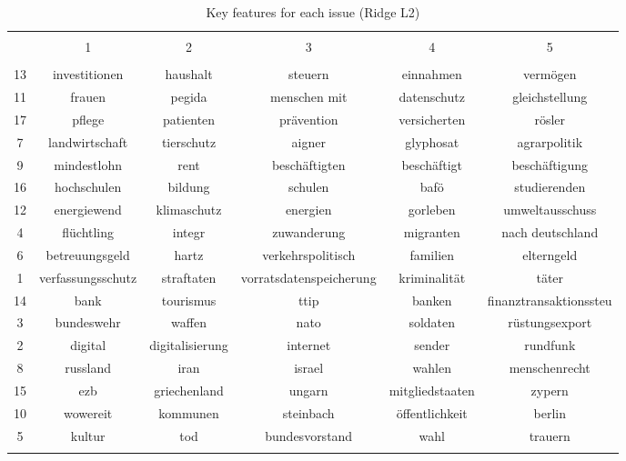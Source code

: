 
\begin{table}[!htbp] \centering 
  \caption{Key features for each issue (Ridge L2)} 
  \label{tab:key_feats} 
\begin{tabular}{@{\extracolsep{5pt}} cccccc} 
\\[-1.8ex]\hline 
\hline \\[-1.8ex] 
 & 1 & 2 & 3 & 4 & 5 \\ 
\hline \\[-1.8ex] 
13 & investitionen & haushalt & steuern & einnahmen & vermögen \\ 
11 & frauen & pegida & menschen mit & datenschutz & gleichstellung \\ 
17 & pflege & patienten & prävention & versicherten & rösler \\ 
7 & landwirtschaft & tierschutz & aigner & glyphosat & agrarpolitik \\ 
9 & mindestlohn & rent & beschäftigten & beschäftigt & beschäftigung \\ 
16 & hochschulen & bildung & schulen & bafö & studierenden \\ 
12 & energiewend & klimaschutz & energien & gorleben & umweltausschuss \\ 
4 & flüchtling & integr & zuwanderung & migranten & nach deutschland \\ 
6 & betreuungsgeld & hartz & verkehrspolitisch & familien & elterngeld \\ 
1 & verfassungsschutz & straftaten & vorratsdatenspeicherung & kriminalität & täter \\ 
14 & bank & tourismus & ttip & banken & finanztransaktionssteu \\ 
3 & bundeswehr & waffen & nato & soldaten & rüstungsexport \\ 
2 & digital & digitalisierung & internet & sender & rundfunk \\ 
8 & russland & iran & israel & wahlen & menschenrecht \\ 
15 & ezb & griechenland & ungarn & mitgliedstaaten & zypern \\ 
10 & wowereit & kommunen & steinbach & öffentlichkeit & berlin \\ 
5 & kultur & tod & bundesvorstand & wahl & trauern \\ 
\hline \\[-1.8ex] 
\end{tabular} 
\end{table} 
